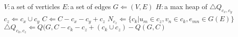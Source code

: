 \documentclass{report}
\begin{document}
\begin{algorithmic}[1]
\State $V:$a set of verticles
\State $E:$a set of edges
\State $G \Leftarrow (V,E)$
\State $H:$a max heap of $\bigtriangleup Q_{c_{x}, c_{y}}$
	\EndIf
	\State$c_{z} \Leftarrow c_{x} \cup c_{y}$
	\State$C \Leftarrow C -  c_{x} - c_{y} + c_{z}$
	\State$N_{c_{z}} \Leftarrow \{c_{k}|u_{m} \in c_{z},v_{n} \in c_{k},e_{mn} \in G(E)\}$
		\State $\bigtriangleup Q_{c_{k}, c_{z}} \Leftarrow Q(G, C-c_{k}-c_{z}+(c_{k}\cup c_{z})-Q(G,C)$
	\EndFor
\EndWhile
	
	 
\end{algorithmic}
\end{document}
